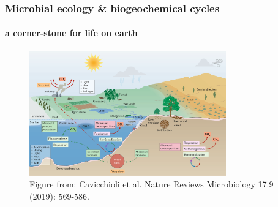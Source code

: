 \documentclass{beamer}
\begin{document}

   \begin{frame}

      \frametitle{Microbial ecology \& biogeochemical cycles}
      \framesubtitle{a corner-stone for life on earth}

      \begin{figure}
         \centering
         \includegraphics[width=85mm]{resources/ecosystem_functioning.png}
         \caption{
            \scriptsize Figure from: Cavicchioli et al.
            \scriptsize Nature Reviews Microbiology 17.9 (2019): 569-586.
         }
      \end{figure}
   \end{frame}
\end{document}
